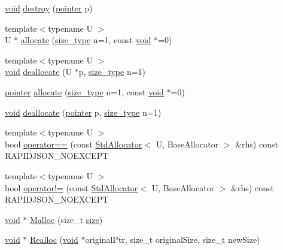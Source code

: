\begin{DoxyCompactItemize}
\item 
\hyperlink{imgui__impl__opengl3__loader_8h_ac668e7cffd9e2e9cfee428b9b2f34fa7}{void} \hyperlink{classStdAllocator_a2aebac89efaaac9707d380b95c902567}{destroy} (\hyperlink{classStdAllocator_a0c970fb2525af736640f0ac3a29d45c5}{pointer} p)
\item 
{\footnotesize template$<$typename U $>$ }\\U $\ast$ \hyperlink{classStdAllocator_afaabcd7ede5a9432ae8dbe604a0c2982}{allocate} (\hyperlink{classStdAllocator_af0b177dc293fe5b985ba9e27de23b2c1}{size\+\_\+type} n=1, const \hyperlink{imgui__impl__opengl3__loader_8h_ac668e7cffd9e2e9cfee428b9b2f34fa7}{void} $\ast$=0)
\item 
{\footnotesize template$<$typename U $>$ }\\\hyperlink{imgui__impl__opengl3__loader_8h_ac668e7cffd9e2e9cfee428b9b2f34fa7}{void} \hyperlink{classStdAllocator_a92371ba62f651185c0d3eef856080cfa}{deallocate} (U $\ast$p, \hyperlink{classStdAllocator_af0b177dc293fe5b985ba9e27de23b2c1}{size\+\_\+type} n=1)
\item 
\hyperlink{classStdAllocator_a0c970fb2525af736640f0ac3a29d45c5}{pointer} \hyperlink{classStdAllocator_aa301f003f6722d438834b377c314247e}{allocate} (\hyperlink{classStdAllocator_af0b177dc293fe5b985ba9e27de23b2c1}{size\+\_\+type} n=1, const \hyperlink{imgui__impl__opengl3__loader_8h_ac668e7cffd9e2e9cfee428b9b2f34fa7}{void} $\ast$=0)
\item 
\hyperlink{imgui__impl__opengl3__loader_8h_ac668e7cffd9e2e9cfee428b9b2f34fa7}{void} \hyperlink{classStdAllocator_a96a27b5bc9919d08013e727f5217db7a}{deallocate} (\hyperlink{classStdAllocator_a0c970fb2525af736640f0ac3a29d45c5}{pointer} p, \hyperlink{classStdAllocator_af0b177dc293fe5b985ba9e27de23b2c1}{size\+\_\+type} n=1)
\item 
{\footnotesize template$<$typename U $>$ }\\bool \hyperlink{classStdAllocator_acec867ea79558926a5e3a5f9bbafaf31}{operator==} (const \hyperlink{classStdAllocator}{Std\+Allocator}$<$ U, Base\+Allocator $>$ \&rhs) const R\+A\+P\+I\+D\+J\+S\+O\+N\+\_\+\+N\+O\+E\+X\+C\+E\+PT
\item 
{\footnotesize template$<$typename U $>$ }\\bool \hyperlink{classStdAllocator_a6d1d3ae1297ec63f6043f06d26b99df7}{operator!=} (const \hyperlink{classStdAllocator}{Std\+Allocator}$<$ U, Base\+Allocator $>$ \&rhs) const R\+A\+P\+I\+D\+J\+S\+O\+N\+\_\+\+N\+O\+E\+X\+C\+E\+PT
\item 
\hyperlink{imgui__impl__opengl3__loader_8h_ac668e7cffd9e2e9cfee428b9b2f34fa7}{void} $\ast$ \hyperlink{classStdAllocator_ac56f94d87a4e3864ede25f65602daf64}{Malloc} (size\+\_\+t \hyperlink{imgui__impl__opengl3__loader_8h_a3d1e3edfcf61ca2d831883e1afbad89e}{size})
\item 
\hyperlink{imgui__impl__opengl3__loader_8h_ac668e7cffd9e2e9cfee428b9b2f34fa7}{void} $\ast$ \hyperlink{classStdAllocator_aa2743f6ccc125c6313917d8fd71dc847}{Realloc} (\hyperlink{imgui__impl__opengl3__loader_8h_ac668e7cffd9e2e9cfee428b9b2f34fa7}{void} $\ast$original\+Ptr, size\+\_\+t original\+Size, size\+\_\+t new\+Size)
\end{DoxyCompactItemize}
